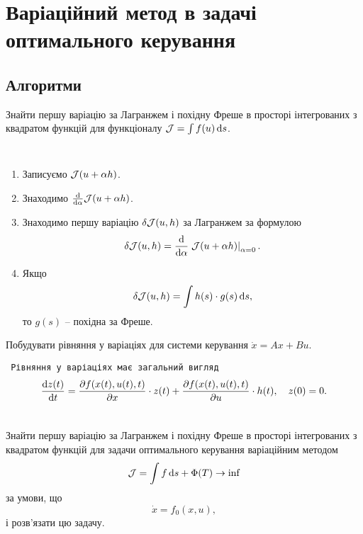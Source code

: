 \section{Варіаційний метод в задачі оптимального керування}

\subsection{Алгоритми}

\begin{problem*}
	Знайти першу варіацію за Лагранжем і похідну Фреше в просторі інтегрованих з квадратом функцій для функціоналу $\mathcal{J} = \int f(u) \mathop{}\!\mathrm{d} s$.
\end{problem*}

\begin{algorithm} \tt
	\begin{enumerate}
		\item Записуємо $\mathcal{J}(u + \alpha h)$.
		\item Знаходимо $\frac{\mathop{}\!\mathrm{d}}{\mathop{}\!\mathrm{d} \alpha} \mathcal{J}(u + \alpha h)$.
		\item Знаходимо першу варіацію $\delta \mathcal{J} (u, h)$ за Лагранжем за формулою \[ \delta \mathcal{J}(u, h) = \frac{\mathop{}\!\mathrm{d}}{\mathop{}\!\mathrm{d} \alpha} \left.\mathcal{J}(u + \alpha h)\right|_{\alpha = 0}. \]
		\item Якщо \[\delta \mathcal{J} (u, h) = \int h(s) \cdot g(s) \mathop{}\!\mathrm{d} s,\] то $g(s)$ -- похідна за Фреше.
	\end{enumerate}
\end{algorithm}

\begin{problem*}
	Побудувати рівняння у варіаціях для системи керування $\dot x = A x + B u$.
\end{problem*}

\begin{algorithm} \tt
	Рівняння у варіаціях має загальний вигляд \[ \frac{\mathop{}\!\mathrm{d} z(t)}{\mathop{}\!\mathrm{d} t} = \frac{\partial f(x(t),u(t),t)}{\partial x} \cdot z(t) + \frac{\partial f(x(t),u(t),t)}{\partial u} \cdot h(t), \quad z(0) = 0. \]
\end{algorithm}

\begin{problem*}
	Знайти першу варіацію за Лагранжем і похідну Фреше в просторі інтегрованих з квадратом функцій для задачи оптимального керування варіаційним методом \[ \mathcal{J} = \int f \mathop{}\!\mathrm{d} s + \Phi(T) \to \inf \] за умови, що \[ \dot x = f_0 (x, u), \] і розв'язати цю задачу.
\end{problem*}

